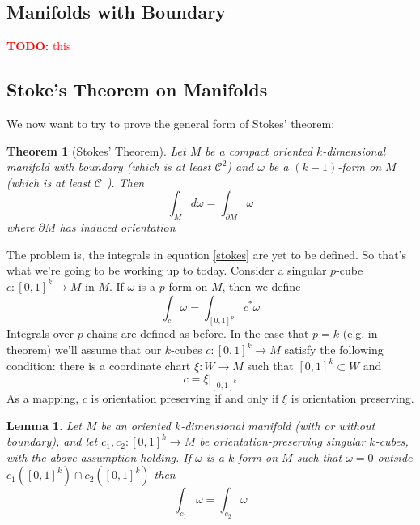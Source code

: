\documentclass{article}
\newtheorem{theorem}{Theorem}
\newtheorem{lemma}{Lemma}
\newcommand{\mc}[1]{\mathcal{#1}}
\newcommand{\TODO}[1]{\textcolor{red}{\textbf{TODO:} #1}}
\begin{document}
\subsection{Manifolds with Boundary}

\TODO{this}

\subsection{Stoke's Theorem on Manifolds}


We now want to try to prove the general form of Stokes' theorem:
\begin{theorem}[Stokes' Theorem]

  Let \(M\) be a compact oriented \(k\)-dimensional manifold with boundary (which is at least
  \(\mc{C}^2\)) and \(\omega\) be a \((k - 1)\)-form on \(M\) (which is at least \(\mc{C}^1\)). Then
  \begin{equation}
    \int_Md\omega = \int_{\partial M}\omega
    \label{stokes}
  \end{equation}
  where \(\partial M\) has induced orientation
\end{theorem}
The problem is, the integrals in equation \ref{stokes} are yet to be defined. So that's what we're going to be working up to today.
Consider a singular \(p\)-cube \(c: [0, 1]^k \to M\) in \(M\). If \(\omega\) is a \(p\)-form on \(M\), then we define
\begin{equation}
  \int_c\omega = \int_{[0, 1]^p}c^*\omega
\end{equation}
Integrals over \(p\)-chains are defined as before. In the case that \(p = k\) (e.g. in theorem) we'll assume that our \(k\)-cubes \(c:[0, 1]^k \to M\) satisfy the following condition: there is a coordinate chart \(\xi: W \to M\) such that \([0, 1]^k \subset W\) and
\begin{equation}
  c = \xi|_{[0, 1]^k}
\end{equation}
As a mapping, \(c\) is orientation preserving if and only if \(\xi\) is orientation preserving.
\begin{lemma}
  Let \(M\) be an oriented \(k\)-dimensional manifold (with or without boundary), and let \(c_1, c_2: [0, 1]^k \to M\) be orientation-preserving singular \(k\)-cubes, with the above assumption holding. If \(\omega\) is a \(k\)-form on \(M\) such that \(\omega = 0\) outside \(c_1([0, 1]^k) \cap c_2([0, 1]^k)\) then
  \begin{equation}
    \int_{c_1}\omega = \int_{c_2}\omega
  \end{equation}
  \label{cind}
\end{lemma}
\end{document}
